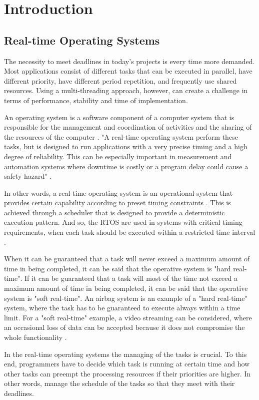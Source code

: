 \documentclass[12pt]{report}%
\begin{document}
\chapter{Introduction}
\section{Real-time Operating Systems}
The necessity to meet deadlines in today's projects is every time more demanded. Most applications consist of different tasks that can be executed in parallel, have different priority, have different period repetition, and frequently use shared resources. Using a multi-threading approach, however,  can create a challenge in terms of performance, stability and time of implementation.

An operating system is a software component of a computer system that is responsible for the management and coordination of activities and the sharing of the resources of the computer \cite{mcgraw}. "A real-time operating system perform these tasks, but is designed to run applications with a very precise timing and a high degree of reliability. This can be especially important in measurement and automation systems where downtime is costly or a program delay could cause a safety hazard" \cite{rtos}.

In other words, a real-time operating system is an operational system that provides certain capability according to preset timing constraints \cite{whatisRTOS}. This is achieved through a scheduler that is designed to provide a deterministic execution pattern. And so, the RTOS are used in systems with critical timing requirements, when each task should be executed within a restricted time interval \cite{whatisRTOS}.

When it can be guaranteed that a task will never exceed a maximum amount of time in being completed, it can be said that the operative system is "hard real-time". If it can be guaranteed that a task will most of the time not exceed a maximum amount of time in being completed, it can be said that the operative system is "soft real-time". An airbag system is an example of a "hard real-time" system, where the task has to be guaranteed to execute always within a time limit. For a "soft real-time" example, a video streaming can be considered, where an occasional loss of data can be accepted because it does not compromise the whole functionality \cite{rtos}.

In the real-time operating systems the managing of the tasks is crucial. To this end, programmers have to decide which task is running at certain time and how other tasks can preempt the processing resources if their priorities are higher. In other words, manage the schedule of the tasks so that they meet with their deadlines.
\end{document}

